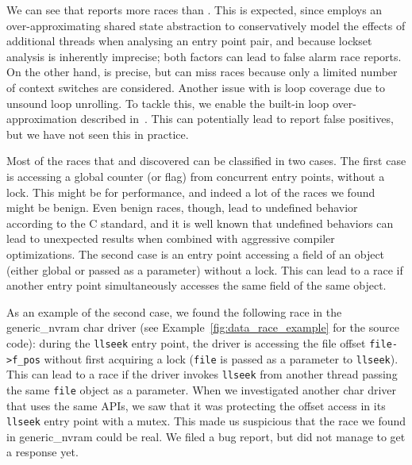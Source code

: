 We can see that \whoop reports more races than \corral. This is expected, since \whoop employs an over-approximating shared state abstraction to conservatively model the effects of additional threads when analysing an entry point pair, and because lockset analysis is inherently imprecise; both factors can lead to false alarm race reports.  On the other hand, \corral is precise, but can miss races because only a limited number of context switches are considered.  Another issue with \corral is loop coverage due to unsound loop unrolling. To tackle this, we enable the built-in loop over-approximation described in~\cite{lal2014powering}. This can potentially lead \corral to report false positives, but we have not seen this in practice.  

Most of the races that \whoop and \corral discovered can be classified in two cases. The first case is accessing a global counter (or flag) from concurrent entry points, without a lock. This might be for performance, and indeed a lot of the races we found might be benign. Even benign races, though, lead to undefined behavior according to the C standard, and it is well known that undefined behaviors can lead to unexpected results when combined with aggressive compiler optimizations. The second case is an entry point accessing a field of an object (either global or passed as a parameter) without a lock. This can lead to a race if another entry point simultaneously accesses the same field of the same object.

As an example of the second case, we found the following race in the generic\_nvram char driver (see Example~\ref{fig:data_race_example} for the source code): during the \texttt{llseek} entry point, the driver is accessing the file offset \texttt{file->f\_pos} without first acquiring a lock (\texttt{file} is passed as a parameter to \texttt{llseek}). This can lead to a race if the driver invokes \texttt{llseek} from another thread passing the same \texttt{file} object as a parameter. When we investigated another char driver that uses the same APIs, we saw that it was protecting the offset access in its \texttt{llseek} entry point with a mutex. This made us suspicious that the race we found in generic\_nvram could be real. We filed a bug report, but did not manage to get a response yet.

